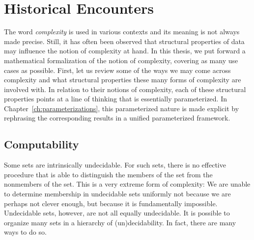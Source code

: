 \section{Historical Encounters}

The word \emph{complexity} is used in various contexts and its meaning is not always made precise.
Still, it has often been observed that structural properties of data may influence the notion of complexity at hand.
In this thesis, we put forward a mathematical formalization of the notion of complexity, covering as many use cases as possible.
First, let us review some of the ways we may come across complexity and what structural properties these many forms of complexity are involved with.
In relation to their notions of complexity, each of these structural properties points at a line of thinking that is essentially parameterized.
In Chapter~\ref{ch:parameterizations}, this parameterized nature is made explicit by rephrasing the corresponding results in a unified parameterized framework.

\subsection{Computability}
Some sets are intrinsically undecidable.
For such sets, there is no effective procedure that is able to distinguish the members of the set from the nonmembers of the set.
This is a very extreme form of complexity:
We are unable to determine membership in undecidable sets uniformly not because we are perhaps not clever enough, but because it is fundamentally impossible.
Undecidable sets, however, are not all equally undecidable.
It is possible to organize many sets in a hierarchy of (un)decidability.
In fact, there are many ways to do so.

